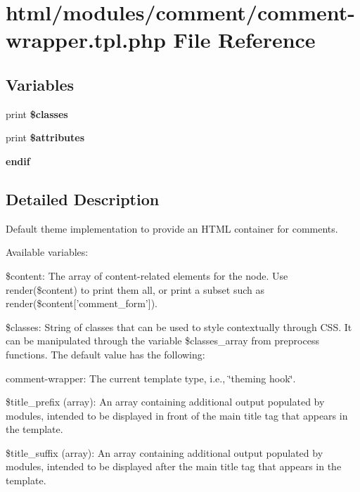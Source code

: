 \hypertarget{modules_2comment_2comment-wrapper_8tpl_8php}{
\section{html/modules/comment/comment-\/wrapper.tpl.php File Reference}
\label{modules_2comment_2comment-wrapper_8tpl_8php}
}
\subsection*{Variables}
\begin{DoxyCompactItemize}
\item 
\hypertarget{modules_2comment_2comment-wrapper_8tpl_8php_a6d48ecbdbc70ca1812e665169b5fa1e2}{
print {\bfseries \$classes}}
\label{modules_2comment_2comment-wrapper_8tpl_8php_a6d48ecbdbc70ca1812e665169b5fa1e2}

\item 
\hypertarget{modules_2comment_2comment-wrapper_8tpl_8php_a9c88c4272fa40546577b45392a0b3cd3}{
print {\bfseries \$attributes}}
\label{modules_2comment_2comment-wrapper_8tpl_8php_a9c88c4272fa40546577b45392a0b3cd3}

\item 
\hypertarget{modules_2comment_2comment-wrapper_8tpl_8php_a82cd33ca97ff99f2fcc5e9c81d65251b}{
{\bfseries endif}}
\label{modules_2comment_2comment-wrapper_8tpl_8php_a82cd33ca97ff99f2fcc5e9c81d65251b}

\end{DoxyCompactItemize}


\subsection{Detailed Description}
Default theme implementation to provide an HTML container for comments.

Available variables:
\begin{DoxyItemize}
\item \$content: The array of content-\/related elements for the node. Use render(\$content) to print them all, or print a subset such as render(\$content\mbox{[}'comment\_\-form'\mbox{]}).
\item \$classes: String of classes that can be used to style contextually through CSS. It can be manipulated through the variable \$classes\_\-array from preprocess functions. The default value has the following:
\begin{DoxyItemize}
\item comment-\/wrapper: The current template type, i.e., \char`\"{}theming hook\char`\"{}.
\end{DoxyItemize}
\item \$title\_\-prefix (array): An array containing additional output populated by modules, intended to be displayed in front of the main title tag that appears in the template.
\item \$title\_\-suffix (array): An array containing additional output populated by modules, intended to be displayed after the main title tag that appears in the template.
\end{DoxyItemize}

